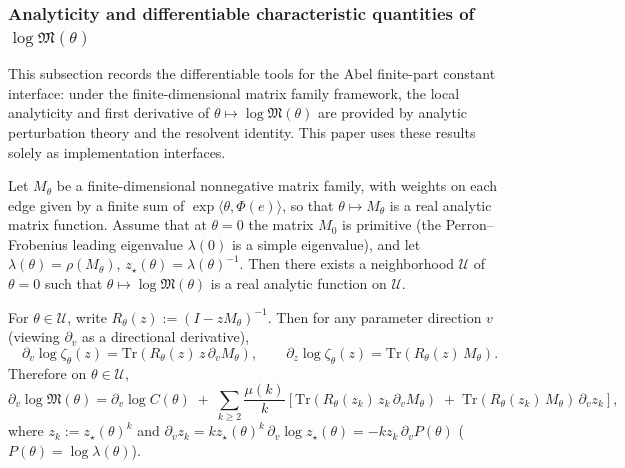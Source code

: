 \subsubsection{Analyticity and differentiable characteristic quantities of \texorpdfstring{$\log\mathfrak{M}(\theta)$}{logM(theta)}}\label{subsec:logM-analyticity}
This subsection records the differentiable tools for the Abel finite-part constant interface: under the finite-dimensional matrix family framework, the local analyticity and first derivative of $\theta\mapsto\log\mathfrak{M}(\theta)$ are provided by analytic perturbation theory and the resolvent identity. This paper uses these results solely as implementation interfaces.

\begin{remark}\label{prop:logM-analytic}
Let $M_\theta$ be a finite-dimensional nonnegative matrix family, with weights on each edge given by a finite sum of $\exp\langle\theta,\Phi(e)\rangle$, so that $\theta\mapsto M_\theta$ is a real analytic matrix function.
Assume that at $\theta=0$ the matrix $M_0$ is primitive (the Perron--Frobenius leading eigenvalue $\lambda(0)$ is a simple eigenvalue), and let $\lambda(\theta)=\rho(M_\theta)$, $z_\star(\theta)=\lambda(\theta)^{-1}$.
Then there exists a neighborhood $\mathcal{U}$ of $\theta=0$ such that $\theta\mapsto\log\mathfrak{M}(\theta)$ is a real analytic function on $\mathcal{U}$.
\end{remark}

\begin{remark}\label{prop:logM-derivative-resolvent}
For $\theta\in\mathcal{U}$, write $R_\theta(z):=(I-zM_\theta)^{-1}$.
Then for any parameter direction $v$ (viewing $\partial_v$ as a directional derivative),
\[
\partial_v\log\zeta_\theta(z)=\mathrm{Tr}\!\left(R_\theta(z)\,z\,\partial_v M_\theta\right),
\qquad
\partial_z\log\zeta_\theta(z)=\mathrm{Tr}\!\left(R_\theta(z)\,M_\theta\right).
\]
Therefore on $\theta\in\mathcal{U}$,
\[
\partial_v\log\mathfrak{M}(\theta)
=
\partial_v\log C(\theta)
\;+\;
\sum_{k\ge 2}\frac{\mu(k)}{k}\left[
\mathrm{Tr}\!\left(R_\theta(z_k)\,z_k\,\partial_v M_\theta\right)
\;+\;
\mathrm{Tr}\!\left(R_\theta(z_k)\,M_\theta\right)\,\partial_v z_k
\right],
\]
where $z_k:=z_\star(\theta)^k$ and $\partial_v z_k = k z_\star(\theta)^k\,\partial_v\log z_\star(\theta)=-k z_k\,\partial_v P(\theta)$ ($P(\theta)=\log\lambda(\theta)$).
\end{remark}


